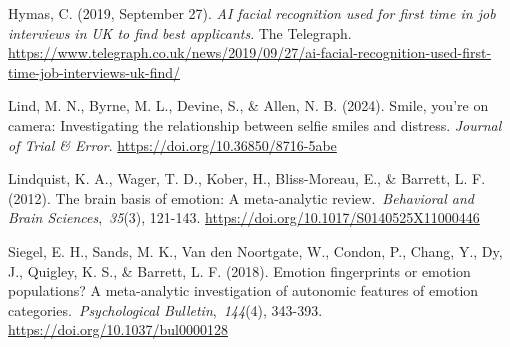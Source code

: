 \documentclass[authordate, reflection,issue]{jote-new-article}
\begin{document}
	Hymas, C. (2019, September 27). \emph{AI facial recognition used for first time in job interviews in } \emph{UK to find best applicants}. The Telegraph. \url{https://www.telegraph.co.uk/news/2019/09/27/ai-facial-recognition-used-first-time-job-interviews-uk-find/}



	Lind, M. N., Byrne, M. L., Devine, S., \& Allen, N. B. (2024). Smile, you're on camera: Investigating the relationship between selfie smiles and distress. \emph{Journal of Trial \& Error}. \url{https://doi.org/10.36850/8716-5abe}



	Lindquist, K. A., Wager, T. D., Kober, H., Bliss-Moreau, E., \& Barrett, L. F. (2012). The brain basis of emotion: A meta-analytic review. \emph{Behavioral and Brain Sciences}, \emph{35}(3), 121-143. \url{https://doi.org/10.1017/S0140525X11000446}



	Siegel, E. H., Sands, M. K., Van den Noortgate, W., Condon, P., Chang, Y., Dy, J., Quigley, K. S., \& Barrett, L. F. (2018). Emotion fingerprints or emotion populations? A meta-analytic investigation of autonomic features of emotion categories. \emph{Psychological Bulletin}, \emph{144}(4), 343-393. \url{https://doi.org/10.1037/bul0000128}
\end{document}
